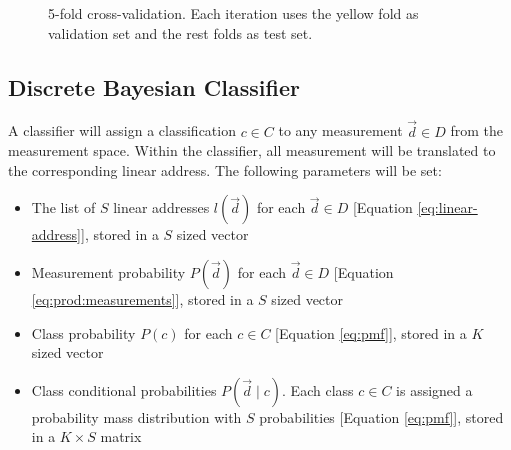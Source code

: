 \documentclass[letterpaper, conference]{IEEEtran}
\begin{document}
\begin{figure}\label{eq:v-fold}
  \caption{5-fold cross-validation. Each iteration uses the yellow fold as validation set and the rest folds as test set.}
\end{figure}
  

\subsection{Discrete Bayesian Classifier}

A classifier will assign a classification $c \in C$ to any measurement $\vec{d} \in D$ from the measurement space. Within the classifier, all measurement will be translated to the corresponding linear address. The following parameters will be set:

\begin{itemize}
  \item The list of $S$ linear addresses $l(\vec{d})$ for each $\vec{d} \in D$ [Equation \ref{eq:linear-address}], stored in a $S$ sized vector
  \item Measurement probability $P(\vec{d})$ for each  $\vec{d} \in D$ [Equation \ref{eq:prod:measurements}], stored in a $S$ sized vector
  \item Class probability $P(c)$ for each  $c \in C$ [Equation \ref{eq:pmf}], stored in a $K$ sized vector
  \item Class conditional probabilities $P(\vec{d} \mid c)$. Each class $c \in C$ is assigned a probability mass distribution with $S$ probabilities [Equation \ref{eq:pmf}], stored in a $K \times S$ matrix
\end{itemize}
\end{document}
